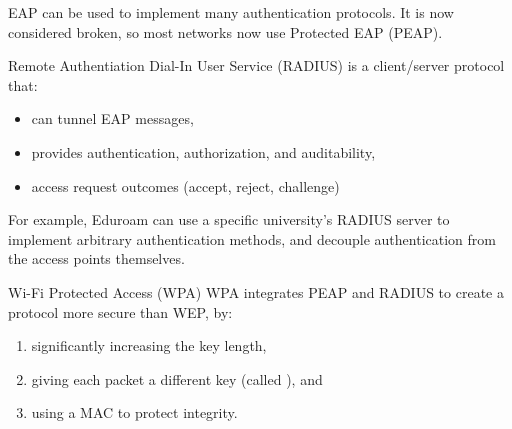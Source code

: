 EAP can be used to implement many authentication protocols. It is now considered broken, so most networks now use Protected EAP (PEAP).

\begin{dfnbox}{Remote Authentiation Dial-In User Service (RADIUS)}{}
     is a client/server protocol that:
    \begin{itemize}
        \item can tunnel EAP messages,
        \item provides authentication, authorization, and auditability,
        \item access request outcomes (accept, reject, challenge)
    \end{itemize}
\end{dfnbox}

For example, Eduroam can use a specific university's RADIUS server to implement arbitrary authentication methods, and decouple authentication from the access points themselves.

\begin{dfnbox}{Wi-Fi Protected Access (WPA)}{}
    WPA integrates PEAP and RADIUS to create a protocol more secure than WEP, by:
    \begin{enumerate}
        \item significantly increasing the key length,
        \item giving each packet a different key (called ), and
        \item using a MAC to protect integrity.
    \end{enumerate}
\end{dfnbox}

